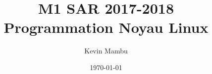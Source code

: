 \documentclass[10pt]{article}
\author{Kevin Mambu}
\date{\today}
\title{M1 SAR 2017-2018\\Programmation Noyau Linux}
\begin{document}
\maketitle

\newpage
\tableofcontents

\newpage


\newpag

\end{document}
